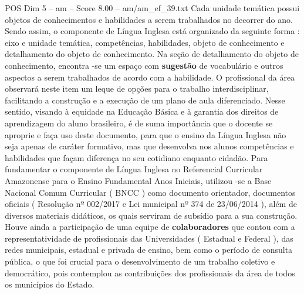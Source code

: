 \begin{textsample}{POS Dim 5 – am – Score 8.00 – am/am\_ef\_39.txt}
Cada unidade temática possui objetos de conhecimentos e habilidades a serem trabalhados no decorrer do ano.
Sendo assim, o componente de Língua Inglesa está organizado da seguinte forma : eixo e unidade temática, competências, habilidades, objeto de conhecimento e detalhamento do objeto de conhecimento.
Na seção de detalhamento do objeto de conhecimento, encontra -se um espaço com \textbf{sugestão} de vocabulário e outros aspectos a serem trabalhados de acordo com a habilidade.
O profissional da área observará neste item um leque de opções para o trabalho interdisciplinar, facilitando a construção e a execução de um plano de aula diferenciado.
Nesse sentido, visando à equidade na Educação Básica e à garantia dos direitos de aprendizagem do aluno brasileiro, é de suma importância que o docente se aproprie e faça uso deste documento, para que o ensino da Língua Inglesa não seja apenas de caráter formativo, mas que desenvolva nos alunos competências e habilidades que façam diferença no seu cotidiano enquanto cidadão.
Para fundamentar o componente de Língua Inglesa no Referencial Curricular Amazonense para o Ensino Fundamental Anos Iniciais, utilizou -se a Base Nacional Comum Curricular ( BNCC ) como documento orientador, documentos oficiais ( Resolução nº 002/2017 e Lei municipal nº 374 de 23/06/2014 ), além de diversos materiais didáticos, os quais serviram de subsídio para a sua construção.
Houve ainda a participação de uma equipe de \textbf{colaboradores} que contou com a representatividade de profissionais das Universidades ( Estadual e Federal ), das redes municipais, estadual e privada de ensino, bem como o período de consulta pública, o que foi crucial para o desenvolvimento de um trabalho coletivo e democrático, pois contemplou as contribuições dos profissionais da área de todos os municípios do Estado.

\end{textsample}
